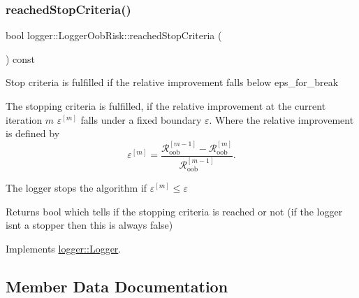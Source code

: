 \mbox{\label{classlogger_1_1_logger_oob_risk_a15c6792b0e1d2acbdd907f697f2884f3}} 
\subsubsection{\texorpdfstring{reached\+Stop\+Criteria()}{reachedStopCriteria()}}
{\footnotesize\ttfamily bool logger\+::\+Logger\+Oob\+Risk\+::reached\+Stop\+Criteria (\begin{DoxyParamCaption}{ }\end{DoxyParamCaption}) const\hspace{0.3cm}{\ttfamily [virtual]}}



Stop criteria is fulfilled if the relative improvement falls below {\ttfamily eps\+\_\+for\+\_\+break} 

The stopping criteria is fulfilled, if the relative improvement at the current iteration $m$ $\varepsilon^{[m]}$ falls under a fixed boundary $\varepsilon$. Where the relative improvement is defined by \[ \varepsilon^{[m]} = \frac{\mathcal{R}_\mathrm{oob}^{[m-1]} - \mathcal{R}_\mathrm{oob}^{[m]}}{\mathcal{R}_\mathrm{oob}^{[m-1]}}. \]

The logger stops the algorithm if $\varepsilon^{[m]} \leq \varepsilon$

\begin{DoxyReturn}{Returns}
{\ttfamily bool} which tells if the stopping criteria is reached or not (if the logger isn\textquotesingle{}t a stopper then this is always false) 
\end{DoxyReturn}


Implements \mbox{\hyperlink{classlogger_1_1_logger_aed91421c07062b91cee158ef2bda7ae8}{logger\+::\+Logger}}.



\subsection{Member Data Documentation}
\mbox{\label{classlogger_1_1_logger_oob_risk_ac4c642d6e83bfa16cc5c6026a1238f58}} 
